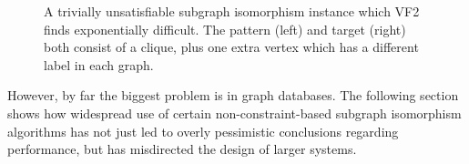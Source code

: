 \documentclass[twoside,11pt]{article}
\begin{document}
\begin{figure}[tb]
    \centering
    \caption{A trivially unsatisfiable subgraph isomorphism instance which VF2 finds exponentially
    difficult. The pattern (left) and target (right) both consist of a clique, plus one extra vertex
    which has a different label in each graph.}\label{figure:vf2-stupidity}
\end{figure}


However, by far the biggest problem is in graph databases. The following section shows how
widespread use of certain non-constraint-based subgraph isomorphism algorithms has not just led to
overly pessimistic conclusions regarding performance, but has misdirected the design of larger
systems.
\end{document}
